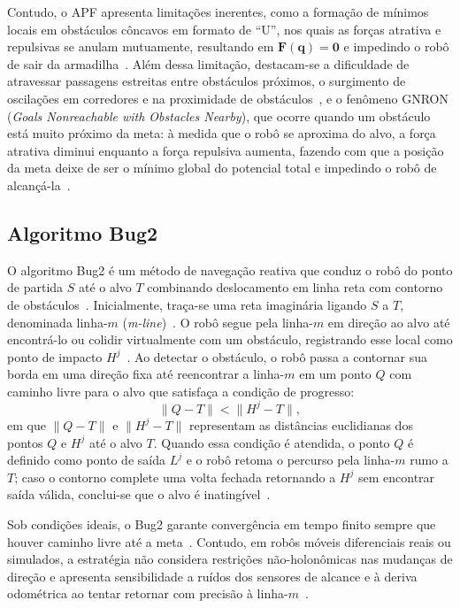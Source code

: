 Contudo, o APF apresenta limitações inerentes, como a formação de mínimos
locais em obstáculos côncavos em formato de ``U'', nos quais as forças   
atrativa e repulsivas se anulam mutuamente, resultando em     
$\mathbf{F}(\mathbf{q}) = \mathbf{0}$ e impedindo o robô de sair da 
armadilha~\cite{khatib1986,koren1991}. Além dessa limitação, destacam-se
a dificuldade de atravessar passagens estreitas entre obstáculos 
próximos, o surgimento de oscilações em corredores e na proximidade de 
obstáculos~\cite{koren1991}, e o fenômeno GNRON (\textit{Goals
Nonreachable with Obstacles Nearby}), que ocorre quando um obstáculo está
muito próximo da meta: à medida que o robô se aproxima do alvo, a força
atrativa diminui enquanto a força repulsiva aumenta, fazendo com que a
posição da meta deixe de ser o mínimo global do potencial total e
impedindo o robô de alcançá-la~\cite{ge2000}.


\subsection{Algoritmo Bug2}

O algoritmo Bug2 é um método de navegação reativa que conduz o robô do
ponto de partida $S$ até o alvo $T$ combinando deslocamento em linha reta
com contorno de obstáculos~\cite{lumelsky1987}. Inicialmente, traça-se   
uma reta imaginária ligando $S$ a $T$, denominada linha-$m$              
(\textit{m-line})~\cite{corke2023}. O robô segue pela linha-$m$ em
direção ao alvo até encontrá-lo ou colidir virtualmente com um obstáculo,
registrando esse local como ponto de impacto $H^j$~\cite{lumelsky1987}.  
Ao detectar o obstáculo, o robô passa a contornar sua borda em uma       
direção fixa até reencontrar a linha-$m$ em um ponto $Q$ com caminho     
livre para o alvo que satisfaça a condição de progresso:                 
\begin{equation}
\|Q - T\| < \|H^j - T\|, 
\label{eq:bug2_progresso}
\end{equation}
em que $\|Q - T\|$ e $\|H^j - T\|$ representam as distâncias euclidianas
dos pontos $Q$ e $H^j$ até o alvo $T$. Quando essa condição é atendida, o
ponto $Q$ é definido como ponto de saída $L^j$ e o robô retoma o percurso
pela linha-$m$ rumo a $T$; caso o contorno complete uma volta fechada
retornando a $H^j$ sem encontrar saída válida, conclui-se que o alvo é   
inatingível~\cite{lumelsky1987}.

Sob condições ideais, o Bug2 garante convergência em tempo finito sempre
que houver caminho livre até a meta~\cite{lumelsky1987}. Contudo, em   
robôs móveis diferenciais reais ou simulados, a estratégia não considera 
restrições não-holonômicas nas mudanças de direção e apresenta
sensibilidade a ruídos dos sensores de alcance e à deriva odométrica ao 
tentar retornar com precisão à linha-$m$~\cite{siegwart2004,corke2023}.


